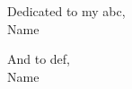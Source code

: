 
\pagecolor{abstractback}

\vspace*{3.5cm}

{

\raggedleft {} \selectfont \Large

\color{sophia}

{\large Dedicated to my abc,} \\
Name \\

\vspace{1cm}

{\large And to def,} \\
Name \\

}

\vfill

\clearpage\nopagecolor
\cleardoublepage